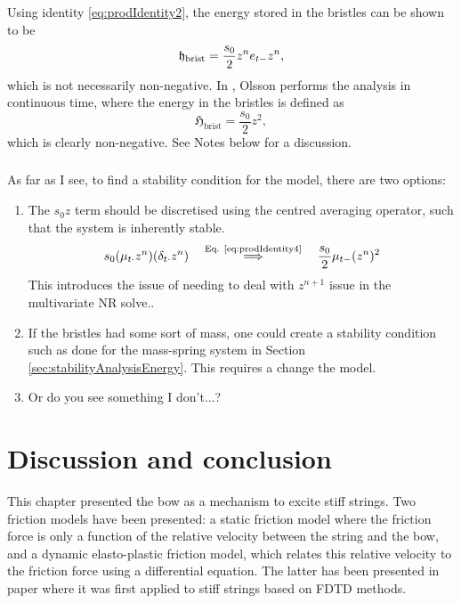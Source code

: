 Using identity \eqref{eq:prodIdentity2}, the energy stored in the bristles can be shown to be
\begin{equation}
    \mathfrak{h}_\text{brist} = \frac{s_0}{2}z^ne_{t-}z^n,
\end{equation}
which is not necessarily non-negative. In \cite{Olsson1996}, Olsson performs the analysis in continuous time, where the energy in the bristles is defined as 
\begin{equation}
    \mathfrak{H}_\text{brist} = \frac{s_0}{2} z^2,
\end{equation}
which is clearly non-negative. See Notes below for a discussion. 


\subsubsection{}
As far as I see, to find a stability condition for the model, there are two options:
\begin{enumerate}
    \item The $s_0z$ term should be discretised using the centred averaging operator, such that the system is inherently stable.
    \begin{equation}
        s_0 (\mu_{t\cdot} z^n)(\delta_{t\cdot} z^n)\quad \overset{\text{Eq. \eqref{eq:prodIdentity4}}}{\Longrightarrow} \quad \frac{s_0}{2}\mu_{t-}(z^n)^2
    \end{equation}
    This introduces the issue of needing to deal with $z^{n+1}$ issue in the multivariate NR solve.. 
    \item If the bristles had some sort of mass, one could create a stability condition such as done for the mass-spring system in Section \ref{sec:stabilityAnalysisEnergy}. This requires a change the model.
    \item Or do you see something I don't...?
\end{enumerate}

\section{Discussion and conclusion}
This chapter presented the bow as a mechanism to excite stiff strings. Two friction models have been presented: a static friction model where the friction force is only a function of the relative velocity between the string and the bow, and a dynamic elasto-plastic friction model, which relates this relative velocity to the friction force using a differential equation. The latter has been presented in paper \citeP[C] where it was first applied to stiff strings based on FDTD methods. 


